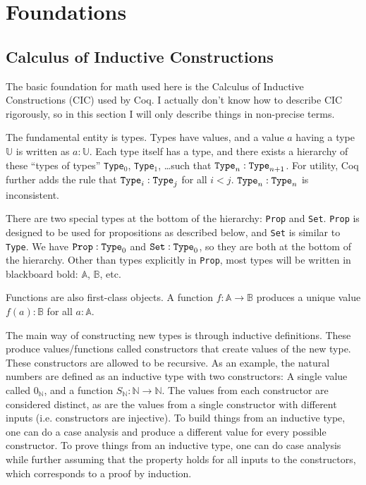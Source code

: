 \documentclass[../../math.tex]{subfiles}
\begin{document}
\chapter{Foundations} \label{chap_foundations}

\section{Calculus of Inductive Constructions}

The basic foundation for math used here is the Calculus of Inductive
Constructions (CIC) used by Coq.  I actually don't know how to describe CIC
rigorously, so in this section I will only describe things in non-precise terms.

The fundamental entity is types.  Types have values, and a value $a$ having a
type $\mathbb U$ is written as $a : \mathbb U$.  Each type itself has a type,
and there exists a hierarchy of these ``types of types'' \verb|Type|$_0$,
\verb|Type|$_1$, \ldots such that $\verb|Type|_n : \verb|Type|_{n + 1}$.  For
utility, Coq further adds the rule that $\verb|Type|_i : \verb|Type|_j$ for all
$i < j$.  $\verb|Type|_n : \verb|Type|_n$ is inconsistent.

There are two special types at the bottom of the hierarchy: \verb|Prop| and
\verb|Set|.  \verb|Prop| is designed to be used for propositions as described
below, and \verb|Set| is similar to \verb|Type|.  We have $\verb|Prop| :
\verb|Type|_0$ and $\verb|Set| : \verb|Type|_0$, so they are both at the bottom
of the hierarchy.  Other than types explicitly in \verb|Prop|, most types will
be written in blackboard bold: $\mathbb A$, $\mathbb B$, etc.

Functions are also first-class objects.  A function $f : \mathbb A \rightarrow
\mathbb B$ produces a unique value $f(a) : \mathbb B$ for all $a : \mathbb A$.

The main way of constructing new types is through inductive definitions.  These
produce values/functions called constructors that create values of the new type.
These constructors are allowed to be recursive.  As an example, the natural
numbers are defined as an inductive type with two constructors: A single value
called $0_{\mathbb N}$, and a function $S_{\mathbb N} : \mathbb N \rightarrow
\mathbb N$.  The values from each constructor are considered distinct, as are
the values from a single constructor with different inputs (i.e. constructors
are injective).  To build things from an inductive type, one can do a case
analysis and produce a different value for every possible constructor.  To prove
things from an inductive type, one can do case analysis while further assuming
that the property holds for all inputs to the constructors, which corresponds to
a proof by induction.
\end{document}

